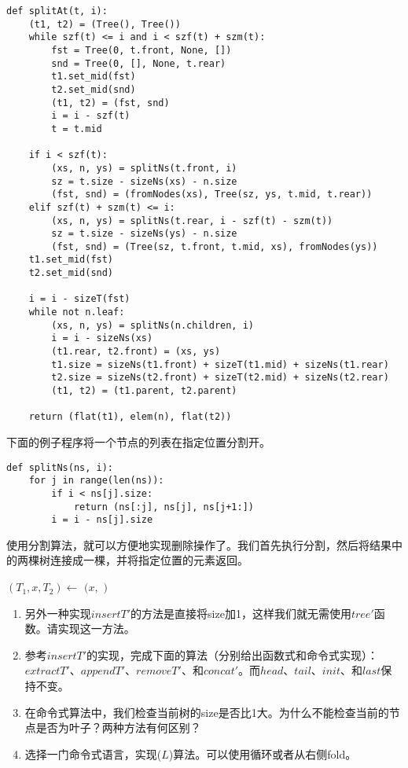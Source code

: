 \documentclass[UTF8]{article}
\begin{document}
\lstset{language=Python}
\begin{lstlisting}
def splitAt(t, i):
    (t1, t2) = (Tree(), Tree())
    while szf(t) <= i and i < szf(t) + szm(t):
        fst = Tree(0, t.front, None, [])
        snd = Tree(0, [], None, t.rear)
        t1.set_mid(fst)
        t2.set_mid(snd)
        (t1, t2) = (fst, snd)
        i = i - szf(t)
        t = t.mid

    if i < szf(t):
        (xs, n, ys) = splitNs(t.front, i)
        sz = t.size - sizeNs(xs) - n.size
        (fst, snd) = (fromNodes(xs), Tree(sz, ys, t.mid, t.rear))
    elif szf(t) + szm(t) <= i:
        (xs, n, ys) = splitNs(t.rear, i - szf(t) - szm(t))
        sz = t.size - sizeNs(ys) - n.size
        (fst, snd) = (Tree(sz, t.front, t.mid, xs), fromNodes(ys))
    t1.set_mid(fst)
    t2.set_mid(snd)

    i = i - sizeT(fst)
    while not n.leaf:
        (xs, n, ys) = splitNs(n.children, i)
        i = i - sizeNs(xs)
        (t1.rear, t2.front) = (xs, ys)
        t1.size = sizeNs(t1.front) + sizeT(t1.mid) + sizeNs(t1.rear)
        t2.size = sizeNs(t2.front) + sizeT(t2.mid) + sizeNs(t2.rear)
        (t1, t2) = (t1.parent, t2.parent)

    return (flat(t1), elem(n), flat(t2))
\end{lstlisting}

下面的例子程序将一个节点的列表在指定位置分割开。

\begin{lstlisting}
def splitNs(ns, i):
    for j in range(len(ns)):
        if i < ns[j].size:
            return (ns[:j], ns[j], ns[j+1:])
        i = i - ns[j].size
\end{lstlisting}

使用分割算法，就可以方便地实现删除操作了。我们首先执行分割，然后将结果中的两棵树连接成一棵，并将指定位置的元素返回。

\begin{algorithmic}
  \State $(T_1, x, T_2) \gets$ 
  \State \Return $(x, $  $)$
\EndFunction
\end{algorithmic}

\begin{Exercise}
\begin{enumerate}
\item 另外一种实现$insertT'$的方法是直接将size加1，这样我们就无需使用$tree'$函数。请实现这一方法。

\item 参考$insertT'$的实现，完成下面的算法（分别给出函数式和命令式实现）：$extractT'$、$appendT'$、$removeT'$、和$concat'$。而$head$、$tail$、$init$、和$last$保持不变。

\item 在命令式算法中，我们检查当前树的size是否比1大。为什么不能检查当前的节点是否为叶子？两种方法有何区别？

\item 选择一门命令式语言，实现($L$)算法。可以使用循环或者从右侧fold。
\end{enumerate}
\end{Exercise}
\end{document}
